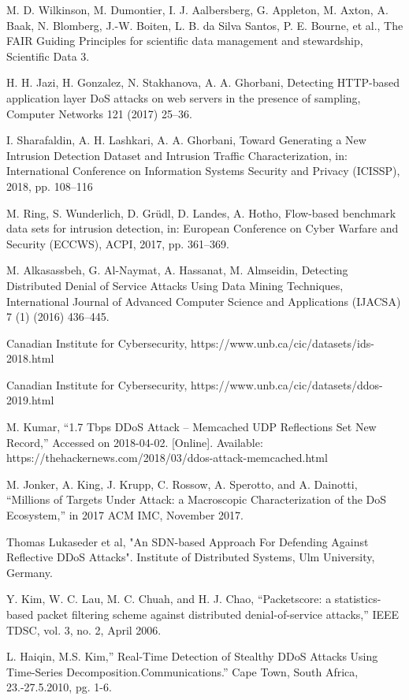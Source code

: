 \begin{thebibliography}{9}
\bibitem{}
M. D. Wilkinson, M. Dumontier, I. J. Aalbersberg, G. Appleton, M. Axton, A. Baak, N. Blomberg, J.-W. Boiten, L. B. da Silva Santos, P. E. Bourne, et al., The FAIR Guiding Principles for scientific data
management and stewardship, Scientific Data 3.

\bibitem{}
H. H. Jazi, H. Gonzalez, N. Stakhanova, A. A. Ghorbani, Detecting HTTP-based application layer DoS attacks on web servers in the presence of sampling, Computer Networks 121 (2017) 25–36.

\bibitem{}
I. Sharafaldin, A. H. Lashkari, A. A. Ghorbani, Toward Generating a New Intrusion Detection Dataset and Intrusion Traffic Characterization, in: International Conference on Information Systems Security and Privacy (ICISSP), 2018, pp. 108–116

\bibitem{}
M. Ring, S. Wunderlich, D. Grüdl, D. Landes, A. Hotho, Flow-based benchmark data sets for intrusion detection, in: European Conference on Cyber Warfare and Security (ECCWS), ACPI, 2017, pp. 361–369.

\bibitem{}
M. Alkasassbeh, G. Al-Naymat, A. Hassanat, M. Almseidin, Detecting Distributed Denial of Service Attacks Using Data Mining Techniques, International Journal of Advanced Computer Science and Applications (IJACSA) 7 (1) (2016) 436–445.

\bibitem{}
Canadian Institute for Cybersecurity, https://www.unb.ca/cic/datasets/ids-2018.html

\bibitem{}
Canadian Institute for Cybersecurity, https://www.unb.ca/cic/datasets/ddos-2019.html

\bibitem{}
M. Kumar, “1.7 Tbps DDoS Attack – Memcached UDP Reflections Set New Record,” Accessed on 2018-04-02. [Online]. Available: https://thehackernews.com/2018/03/ddos-attack-memcached.html

\bibitem{}
M. Jonker, A. King, J. Krupp, C. Rossow, A. Sperotto, and A. Dainotti, “Millions of Targets Under Attack: a Macroscopic Characterization of the DoS Ecosystem,” in 2017 ACM IMC, November 2017.

\bibitem{}
Thomas Lukaseder et al, "An SDN-based Approach For Defending Against Reflective DDoS Attacks". Institute of Distributed Systems, Ulm University, Germany.

\bibitem{}
Y. Kim, W. C. Lau, M. C. Chuah, and H. J. Chao, “Packetscore: a statistics-based packet filtering scheme against distributed denial-of-service attacks,” IEEE TDSC, vol. 3, no. 2, April 2006.

\bibitem{}
L. Haiqin, M.S. Kim,” Real-Time Detection of Stealthy DDoS Attacks Using Time-Series Decomposition.Communications.”
Cape Town, South Africa, 23.-27.5.2010, pg. 1-6.


\end{thebibliography}
